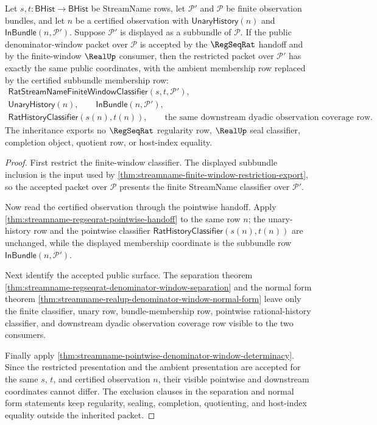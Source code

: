 \begin{theorem}
\label{thm:streamname-regseqrat-denominator-window-subbundle-inheritance}
Let $s,t:\mathsf{BHist}\to\mathsf{BHist}$ be StreamName rows, let
$\mathcal P'$ and $\mathcal P$ be finite observation bundles, and let $n$ be a
certified observation with $\mathsf{UnaryHistory}(n)$ and
$\mathsf{InBundle}(n,\mathcal P')$. Suppose $\mathcal P'$ is displayed as a
subbundle of $\mathcal P$. If the public denominator-window packet over
$\mathcal P$ is accepted by the $\RegSeqRat$ handoff and by the finite-window
$\RealUp$ consumer, then the restricted packet over $\mathcal P'$ has exactly
the same public coordinates, with the ambient membership row replaced by the
certified subbundle membership row:
$$
\begin{gathered}
\mathsf{RatStreamNameFiniteWindowClassifier}(s,t,\mathcal P'),\\
\mathsf{UnaryHistory}(n),\qquad
\mathsf{InBundle}(n,\mathcal P'),\\
\mathsf{RatHistoryClassifier}(s(n),t(n)),\qquad
\text{the same downstream dyadic observation coverage row.}
\end{gathered}
$$
The inheritance exports no $\RegSeqRat$ regularity row, $\RealUp$ seal
classifier, completion object, quotient row, or host-index equality.
\end{theorem}
\begin{proof}
First restrict the finite-window classifier. The displayed subbundle inclusion
is the input used by
\autoref{thm:streamname-finite-window-restriction-export}, so the accepted
packet over $\mathcal P$ presents the finite StreamName classifier over
$\mathcal P'$.

Now read the certified observation through the pointwise handoff. Apply
\autoref{thm:streamname-regseqrat-pointwise-handoff} to the same row $n$; the
unary-history row and the pointwise classifier
$\mathsf{RatHistoryClassifier}(s(n),t(n))$ are unchanged, while the displayed
membership coordinate is the subbundle row
$\mathsf{InBundle}(n,\mathcal P')$.

Next identify the accepted public surface. The separation theorem
\autoref{thm:streamname-regseqrat-denominator-window-separation} and the normal
form theorem
\autoref{thm:streamname-realup-denominator-window-normal-form} leave only the
finite classifier, unary row, bundle-membership row, pointwise rational-history
classifier, and downstream dyadic observation coverage row visible to the two
consumers.

Finally apply
\autoref{thm:streamname-pointwise-denominator-window-determinacy}. Since the
restricted presentation and the ambient presentation are accepted for the same
$s$, $t$, and certified observation $n$, their visible pointwise and downstream
coordinates cannot differ. The exclusion clauses in the separation and normal
form statements keep regularity, sealing, completion, quotienting, and
host-index equality outside the inherited packet.
\end{proof}

